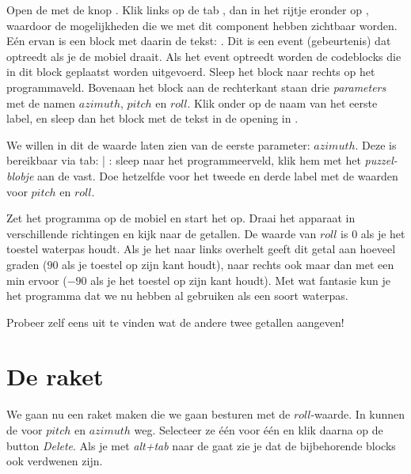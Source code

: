Open de  met de knop 
\linebreak {}. 
Klik links op de tab , dan in het rijtje eronder op 
, waardoor de mogelijkheden die we met dit component hebben zichtbaar worden. E\'en ervan is een block met daarin de tekst: 
\linebreak {}. 
Dit is een event (gebeurtenis) dat optreedt als je de mobiel draait. 
Als het event optreedt worden de codeblocks die in dit block geplaatst worden uitgevoerd. Sleep het block naar rechts op het programmaveld. Bovenaan het block aan de rechterkant staan drie \emph{parameters} met de namen $azimuth$, $pitch$ en $roll$. Klik onder  op de naam van het eerste label, en sleep dan het block met de tekst  in de opening in . 


We willen in dit  de waarde laten zien van de eerste parameter: $azimuth$. Deze is bereikbaar via tab:  | : sleep  naar het programmeerveld, klik hem met het \emph{puzzel-blobje} aan de  vast. Doe hetzelfde voor het tweede en derde label met de waarden voor $pitch$ en $roll$.


\runOpTelefoon{}
Zet het programma op de mobiel en start het op. Draai het apparaat in verschillende richtingen en kijk naar de getallen. De waarde van $roll$ is $0$ als je het toestel waterpas houdt. Als je het naar links overhelt geeft dit getal aan hoeveel graden ($90$ als je toestel op zijn kant houdt), naar rechts ook maar dan met een min ervoor ($-90$ als je het toestel op zijn kant houdt). Met wat fantasie kun je het programma dat we nu hebben al gebruiken als een soort waterpas.

\begin{opgave}
    \opgVraag
	Probeer zelf eens uit te vinden wat de andere twee getallen aangeven! 
\end{opgave}

\section{De raket}
We gaan nu een raket maken die we gaan besturen met de $roll$-waarde. In \ai kunnen de  voor $pitch$ en $azimuth$ weg. Selecteer ze \'e\'en voor \'e\'en en klik daarna op de button \emph{Delete}. Als je met \emph{alt+tab} naar de  gaat zie je dat de bijbehorende blocks ook verdwenen zijn. 

